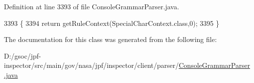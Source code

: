 Definition at line 3393 of file Console\+Grammar\+Parser.\+java.


\begin{DoxyCode}
3393                                             \{
3394       \textcolor{keywordflow}{return} getRuleContext(SpecialCharContext.class,0);
3395     \}
\end{DoxyCode}


The documentation for this class was generated from the following file\+:\begin{DoxyCompactItemize}
\item 
D\+:/gsoc/jpf-\/inspector/src/main/gov/nasa/jpf/inspector/client/parser/\hyperlink{_console_grammar_parser_8java}{Console\+Grammar\+Parser.\+java}\end{DoxyCompactItemize}
